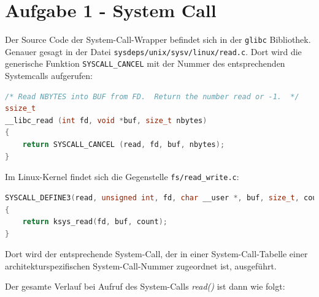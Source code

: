 \documentclass[12pt]{article}
\date{}
\begin{document}
	
\section*{Aufgabe 1 - System Call}
Der Source Code der System-Call-Wrapper befindet sich in der \texttt{glibc} Bibliothek.
Genauer gesagt in der Datei \texttt{sysdeps/unix/sysv/linux/read.c}. Dort wird die generische Funktion \texttt{SYSCALL\_CANCEL} mit der Nummer des entsprechenden Systemcalls aufgerufen:

\begin{lstlisting}[language=c]
/* Read NBYTES into BUF from FD.  Return the number read or -1.  */
ssize_t
__libc_read (int fd, void *buf, size_t nbytes)
{
	return SYSCALL_CANCEL (read, fd, buf, nbytes);
}

\end{lstlisting}

Im Linux-Kernel findet sich die Gegenstelle \texttt{fs/read\_write.c}: 
\begin{lstlisting}[language=c]
SYSCALL_DEFINE3(read, unsigned int, fd, char __user *, buf, size_t, count)
{
	return ksys_read(fd, buf, count);
}
\end{lstlisting}
Dort wird der entsprechende System-Call, der in einer System-Call-Tabelle einer architekturspezifischen System-Call-Nummer zugeordnet ist, ausgeführt.

Der gesamte Verlauf bei Aufruf des System-Calls \emph{read()} ist dann wie folgt:
\end{document}
